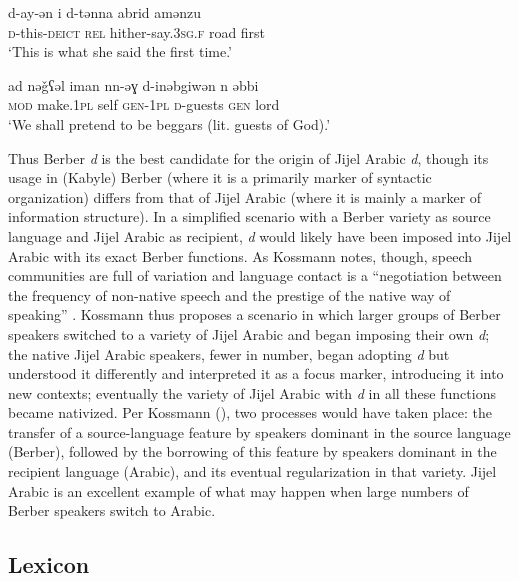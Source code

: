 \documentclass[output=paper]{langsci/langscibook}
\begin{document}
\ea\label{Berber cleft}

\gll d-ay-ǝn  i  d-tǝnna  abrid  amǝnzu\\
     \textsc{d}-this-\textsc{deict}  \textsc{rel}  hither-say.\textsc{3sg.f}  road  first\\
\glt ‘This is what she said the first time.’
\z

\ea\label{Berber secondary}

\gll ad  nǝǧʕǝl  iman  nn-ǝɣ  d-inǝbgiwǝn  n  {\R}ǝbbi\\
     \textsc{mod} make.\textsc{1pl} self \textsc{gen-1pl}  \textsc{d}-guests \textsc{gen}  lord\\
\glt ‘We shall pretend to be beggars (lit. guests of God).’
\z

Thus Berber \textit{d} is the best candidate for the origin of Jijel Arabic \textit{d}, though its usage in (Kabyle) Berber (where it is a primarily marker of syntactic organization) differs from that of Jijel Arabic (where it is mainly a marker of information structure). In a simplified scenario with a Berber variety as source language and Jijel Arabic as recipient, \textit{d} would likely have been imposed into Jijel Arabic with its exact Berber functions. As Kossmann notes, though, speech communities are full of variation and language contact is a “negotiation between the frequency of non-native speech and the prestige of the native way of speaking” \citep[138]{Kossmann2014}. Kossmann thus proposes a scenario in which larger groups of Berber speakers switched to a variety of Jijel Arabic and began imposing their own \textit{d}; the native Jijel Arabic speakers, fewer in number, began adopting \textit{d} but understood it differently and interpreted it as a focus marker, introducing it into new contexts; eventually the variety of Jijel Arabic with \textit{d} in all these functions became nativized. Per Kossmann (\citeyear[138]{Kossmann2014}), two processes would have taken place: the transfer of a source-language feature by speakers dominant in the source language (Berber), followed by the borrowing of this feature by speakers dominant in the recipient language (Arabic), and its eventual regularization in that variety. Jijel Arabic is an excellent example of what may happen when large numbers of Berber speakers switch to Arabic.

\subsection{Lexicon}
\end{document}

